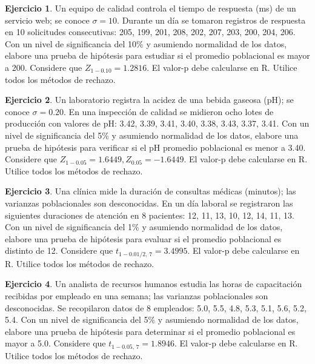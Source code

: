 \documentclass[
  11pt,
]{book}
\theoremstyle{definition}
\theoremstyle{definition}
\theoremstyle{definition}
\newtheorem{exercise}{Ejercicio}[chapter]
\theoremstyle{definition}
\theoremstyle{remark}
\begin{document}
\begin{exercise}
Un equipo de calidad controla el tiempo de respuesta (ms) de un servicio web; se conoce \(\sigma=10\). Durante un día se tomaron registros de respuesta en 10 solicitudes consecutivas: 205, 199, 201, 208, 202, 207, 203, 200, 204, 206. Con un nivel de significancia del 10\% y asumiendo normalidad de los datos, elabore una prueba de hipótesis para estudiar si el promedio poblacional es mayor a 200. Considere que \(Z_{1-0.10}=1.2816\). El valor-p debe calcularse en R. Utilice todos los métodos de rechazo.
\end{exercise}

\begin{exercise}
Un laboratorio registra la acidez de una bebida gaseosa (pH); se conoce \(\sigma=0.20\). En una inspección de calidad se midieron ocho lotes de producción con valores de pH: 3.42, 3.39, 3.41, 3.40, 3.38, 3.43, 3.37, 3.41. Con un nivel de significancia del 5\% y asumiendo normalidad de los datos, elabore una prueba de hipótesis para verificar si el pH promedio poblacional es menor a 3.40. Considere que \(Z_{1-0.05}=1.6449, Z_{0.05}=-1.6449\). El valor-p debe calcularse en R. Utilice todos los métodos de rechazo.
\end{exercise}

\begin{exercise}
Una clínica mide la duración de consultas médicas (minutos); las varianzas poblacionales son desconocidas. En un día laboral se registraron las siguientes duraciones de atención en 8 pacientes: 12, 11, 13, 10, 12, 14, 11, 13. Con un nivel de significancia del 1\% y asumiendo normalidad de los datos, elabore una prueba de hipótesis para evaluar si el promedio poblacional es distinto de 12. Considere que \(t_{1-0.01/2,\,7}=3.4995\). El valor-p debe calcularse en R. Utilice todos los métodos de rechazo.
\end{exercise}

\begin{exercise}
Un analista de recursos humanos estudia las horas de capacitación recibidas por empleado en una semana; las varianzas poblacionales son desconocidas. Se recopilaron datos de 8 empleados: 5.0, 5.5, 4.8, 5.3, 5.1, 5.6, 5.2, 5.4. Con un nivel de significancia del 5\% y asumiendo normalidad de los datos, elabore una prueba de hipótesis para determinar si el promedio poblacional es mayor a 5.0. Considere que \(t_{1-0.05,\,7}=1.8946\). El valor-p debe calcularse en R. Utilice todos los métodos de rechazo.
\end{exercise}
\end{document}
